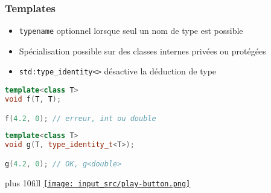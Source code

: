 \documentclass[C++.tex]{subfiles}
\begin{document}
\begin{frame}[fragile]
	\frametitle{Templates}
	\begin{itemize}
		\item \lstinline|typename| optionnel lorsque seul un nom de type est possible
	

		\item Spécialisation possible sur des classes internes privées ou protégées
		\item \lstinline|std:type_identity<>| désactive la déduction de type
	\end{itemize}

	\begin{lstlisting}[language=C++]
template<class T>
void f(T, T);

f(4.2, 0); // erreur, int ou double\end{lstlisting}

	\begin{lstlisting}[language=C++]
template<class T>
void g(T, type_identity_t<T>);

g(4.2, 0); // OK, g<double>\end{lstlisting}

	\vskip 5mm plus 10fill
	\hfill
	\href{https://godbolt.org/#g:!((g:!((g:!((h:codeEditor,i:(filename:'1',fontScale:14,fontUsePx:'0',j:1,lang:c%2B%2B,selection:(endColumn:9,endLineNumber:2,positionColumn:9,positionLineNumber:2,selectionStartColumn:9,selectionStartLineNumber:2,startColumn:9,startLineNumber:2),source:'%23include+%3Ciostream%3E%0A%23include+%3Ctype_traits%3E%0A%0Atemplate%3Cclass+T%3E%0A%23if+1%0AT+foo(T+a,+std::type_identity_t%3CT%3E+b)%0A%23else%0AT+foo(T+a,+T+b)%0A%23endif%0A%7B%0A++return+a+%2B+b%3B%0A%7D%0A%0Aint+main()%0A%7B%0A++std::cout+%3C%3C+foo(4.2,+3)+%3C%3C+%22%5Cn%22%3B%0A%7D%0A'),l:'5',n:'0',o:'C%2B%2B+source+%231',t:'0')),k:50,l:'4',n:'0',o:'',s:0,t:'0'),(g:!((h:executor,i:(argsPanelShown:'1',compilationPanelShown:'0',compiler:g122,compilerName:'',compilerOutShown:'0',execArgs:'',execStdin:'',fontScale:14,fontUsePx:'0',j:1,lang:c%2B%2B,libs:!((name:boost,ver:'175')),options:'-std%3Dc%2B%2B20+-Wall+-Wextra+-pedantic',source:1,stdinPanelShown:'1',tree:'1',wrap:'0'),l:'5',n:'0',o:'Executor+x86-64+gcc+12.2+(C%2B%2B,+Editor+%231)',t:'0')),header:(),k:50,l:'4',n:'0',o:'',s:0,t:'0')),l:'2',n:'0',o:'',t:'0')),version:4}{\texttt{[image: input\_src/play-button.png]}}
\end{frame}
\end{document}

